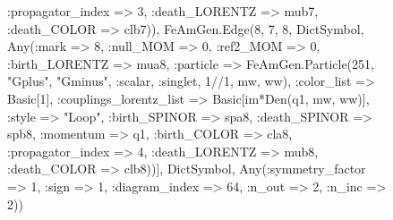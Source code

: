 \documentclass{revtex4}
\begin{document}
\begin{figure}[!htb]
\begin{center}
{:propagator_index => 3, :death_LORENTZ => mub7, :death_COLOR => clb7)), FeAmGen.Edge(8, 7, 8, Dict{Symbol, Any}(:mark => 8, :null_MOM => 0, :ref2_MOM => 0, :birth_LORENTZ => mua8, :particle => FeAmGen.Particle(251, "Gplus", "Gminus", :scalar, :singlet, 1//1, mw, ww), :color_list => Basic[1], :couplings_lorentz_list => Basic[im*Den(q1, mw, ww)], :style => "Loop", :birth_SPINOR => spa8, :death_SPINOR => spb8, :momentum => q1, :birth_COLOR => cla8, :propagator_index => 4, :death_LORENTZ => mub8, :death_COLOR => clb8))], Dict{Symbol, Any}(:symmetry_factor => 1, :sign => 1, :diagram_index => 64, :n_out => 2, :n_inc => 2)) 
}
\end{center}
\end{figure}
\end{document}
